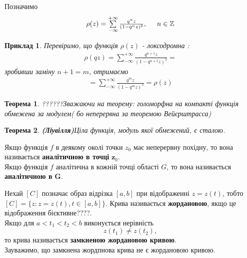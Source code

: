 \documentclass[12pt,a4paper]{article}
\begin{document}
\begin{ozn}
  Позначимо
  \[\begin{array}{l}
   \rho(z)=\sum\limits^{+\infty}_{-\infty}  \frac{q^{n}z}{(1-q^{n}z)^2} ,
   \hspace{0,5cm} n\in \mathbb{Z}
   \end{array}\]
\end{ozn}
\vspace{1,5cm}

\newtheorem{pryk}{Приклад}
\begin{pryk}
Перевіримо, що функція $\rho(z)$ - локсодромна :\\
\[\begin{array}{l}
 \rho(qz)=\sum\limits^{+\infty}_{-\infty}  \frac{q^{n+1}z}{(1-q^{n+1}z)^2}=
\end{array}\]
зробивши заміну $n+1=m$, отримаємо
\[\begin{array}{l}
=\sum\limits^{+\infty}_{-\infty}  \frac{q^{m}z}{(1-q^{m}z)^2}=\rho(z)
\end{array}\]
\end{pryk}
\vspace{1cm}

\newtheorem{thm}{Теорема}
\newtheorem*{thmNoNum}{Теорема}
\begin{thmNoNum}
??????Зважаючи на теорему: голоморфна на компакті функція обмежена за модулем( бо неперервна за теоремою Вейєрштрасса)
\end{thmNoNum}
\vspace{1,5cm}

\begin{thmNoNum}
\textbf{(Ліувілля)}\label{thLiuv}
 Ціла функція, модуль якої обмежений, є сталою.
\end{thmNoNum}
\vspace{1,5cm}

\begin{ozn}
Якщо функція $f$ в деякому околі точки $z_{0}$ має неперервну похідну, то вона називається \textbf{аналітичною в точці} $\mathbf z_{0}$. \\
Якщо функція $f$ аналітична в кожній точці області $G$, то вона називається \textbf{аналітичною в} \label{analitFun}  $\mathbf G$.
\end{ozn}
\vspace{1,5cm}

\begin{ozn}
Нехай $\left [ C  \right ]$ позначає образ відрізка $\left [ a,b  \right ]$  при відображенні $z=z(t)$, тобто $ \left [ C  \right ]=\lbrace z:z=z(t), t \in \left [ a,b  \right ] \rbrace$. Крива називається \textbf{жордановою}\label{GordKryva}, якщо це відображення бієктивне????.\\
Якщо для $a < t_{1} < t_{2} < b$ виконується нерівність $$ z(t_{1})\neq z(t_{2}),$$  то крива називається \textbf{замкненою жордановою кривою}.\\
Зауважимо, що замкнена жордпнова крива не є жордановою кривою.
\end{ozn}
\vspace{1,5cm}
\end{document}

